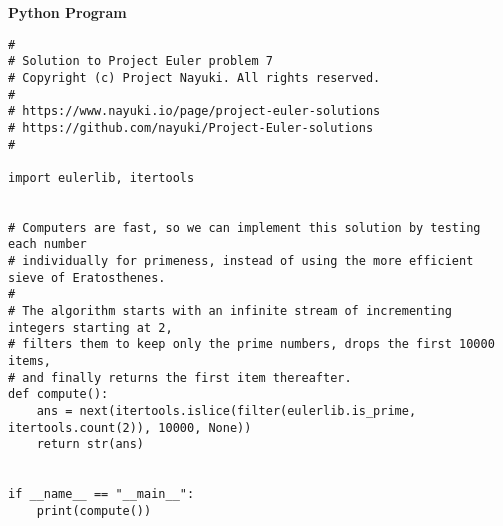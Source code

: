 \textbf{Python Program} \\
\vspace*{-\baselineskip}
\begin{Verbatim}[frame=single, breaklines=true, breakanywhere=true]
# 
# Solution to Project Euler problem 7
# Copyright (c) Project Nayuki. All rights reserved.
# 
# https://www.nayuki.io/page/project-euler-solutions
# https://github.com/nayuki/Project-Euler-solutions
# 

import eulerlib, itertools


# Computers are fast, so we can implement this solution by testing each number
# individually for primeness, instead of using the more efficient sieve of Eratosthenes.
# 
# The algorithm starts with an infinite stream of incrementing integers starting at 2,
# filters them to keep only the prime numbers, drops the first 10000 items,
# and finally returns the first item thereafter.
def compute():
	ans = next(itertools.islice(filter(eulerlib.is_prime, itertools.count(2)), 10000, None))
	return str(ans)


if __name__ == "__main__":
	print(compute())
\end{Verbatim}
